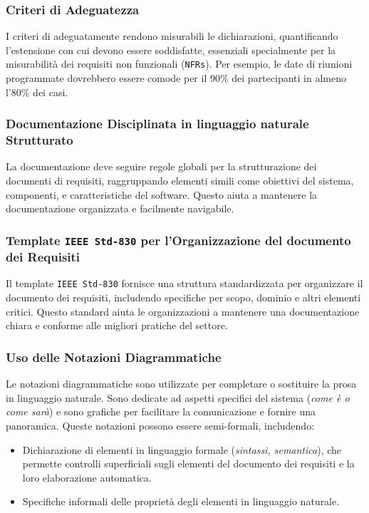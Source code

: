 \subsubsection{Criteri di Adeguatezza}
I criteri di adeguatamente rendono misurabili le dichiarazioni, quantificando l'estensione
con cui devono essere soddisfatte, essenziali specialmente per la misurabilità dei
requisiti non funzionali (\texttt{NFRs}). Per esempio, le date di riunioni programmate
dovrebbero essere comode per il 90\% dei partecipanti in almeno l'80\% dei casi.

\subsubsection{Documentazione Disciplinata in linguaggio naturale Strutturato}
La documentazione deve seguire regole globali per la strutturazione dei documenti di
requisiti, raggruppando elementi simili come obiettivi del sistema, componenti,
e caratteristiche del software. Questo aiuta a mantenere la documentazione organizzata
e facilmente navigabile.

\subsubsection{Template \texttt{IEEE Std-830} per l'Organizzazione del documento dei Requisiti}
Il template  \texttt{IEEE Std-830} fornisce una struttura standardizzata per organizzare 
il documento dei requisiti,
includendo specifiche per scopo, dominio e altri elementi critici. Questo standard aiuta
le organizzazioni a mantenere una documentazione chiara e conforme alle migliori pratiche
del settore.

\subsubsection{Uso delle Notazioni Diagrammatiche}
Le notazioni diagrammatiche sono utilizzate per completare o sostituire la prosa in
linguaggio naturale. Sono dedicate ad aspetti specifici del sistema (\textit{come è o come sarà})
e sono grafiche per facilitare la comunicazione e fornire una panoramica. Queste notazioni
possono essere semi-formali, includendo:

\begin{itemize}
    \item Dichiarazione di elementi in linguaggio formale (\textit{sintassi, semantica}),
    che permette controlli superficiali sugli elementi del documento dei requisiti e la loro elaborazione
    automatica.
    \item Specifiche informali delle proprietà degli elementi in linguaggio naturale.
\end{itemize}
